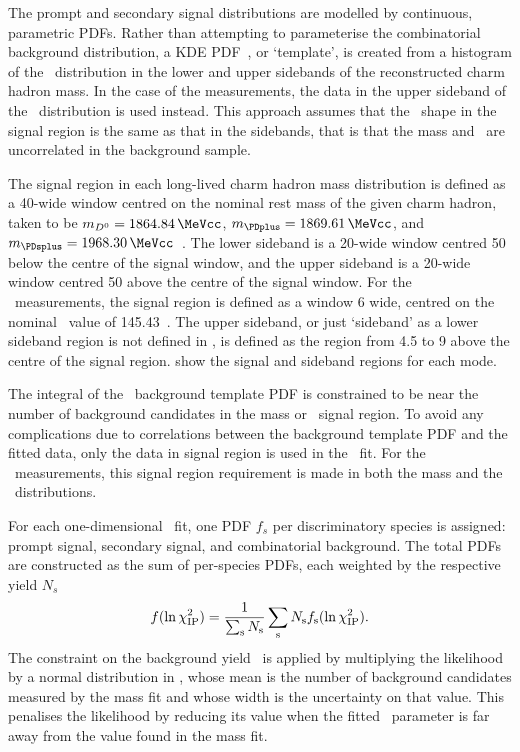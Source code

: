 The prompt and secondary signal distributions are modelled by continuous, 
parametric \acp{PDF}.
Rather than attempting to parameterise the combinatorial background 
distribution, a \acf{KDE} \ac{PDF}~\cite{Poluektov:2014rxa}, or `template', is 
created from a histogram of the \lnipchisq\ distribution in the lower and upper 
sidebands of the reconstructed charm hadron mass.
In the case of the \PDstarp measurements, the data in the upper sideband of the 
\deltam\ distribution is used instead.
This approach assumes that the \lnipchisq\ shape in the signal region is the 
same as that in the sidebands, that is that the mass and \lnipchisq\ are 
uncorrelated in the background sample.

The signal region in each long-lived charm hadron mass distribution is defined 
as a \SI{40}{\MeVcc}-wide window centred on the nominal rest mass of the given 
charm hadron, taken to be ${m_{\PDzero} = \SI{1864.84}{\MeVcc}}$, ${m_{\PDplus} 
  = \SI{1869.61}{\MeVcc}}$, and ${m_{\PDsplus} = 
  \SI{1968.30}{\MeVcc}}$~\cite{PDG2014}.
The lower sideband is a \SI{20}{\MeVcc}-wide window centred \SI{50}{\MeVcc} 
below the centre of the signal window, and the upper sideband is a 
\SI{20}{\MeVcc}-wide window centred \SI{50}{\MeVcc} above the centre of the 
signal window.
For the \PDstarp\ measurements, the signal region is defined as a window 
\SI{6}{\MeVcc} wide, centred on the nominal \deltam\ value of 
\SI{145.43}{\MeVcc}~\cite{PDG2014}.
The upper sideband, or just `sideband' as a lower sideband region is not 
defined in \deltam, is defined as the region from \SI{4.5}{\MeVcc} to 
\SI{9}{\MeVcc} above the centre of the signal region.
show the signal and sideband regions for each mode.

The integral of the \lnipchisq\ background template \ac{PDF} is constrained to 
be near the number of background candidates in the mass or \deltam\ signal 
region.
To avoid any complications due to correlations between the background template 
\ac{PDF} and the fitted data, only the data in signal region is used in the 
\lnipchisq\ fit.
For the \PDstarp\ measurements, this signal region requirement is made in both 
the \PDzero mass and the \deltam\ distributions.

For each one-dimensional \lnipchisq\ fit, one \ac{PDF} $f_{s}$ per 
discriminatory species is assigned: prompt signal, secondary signal, and 
combinatorial background.
The total \acp{PDF} are constructed as the sum of per-species \acp{PDF}, 
each weighted by the respective yield $N_{s}$
\begin{equation}
  f(\ln\chi^2_{\textnormal{IP}}) = \frac{1}{\sum_{\textnormal{s}} N_{\textnormal{s}}}
                  \sum_{\text{s}} N_{\text{s}}
                  f_{\text{s}}(\ln\chi^2_{\textnormal{IP}}).
\end{equation}
The constraint on the background yield \nbkg\ is applied by multiplying the 
likelihood by a normal distribution in \nbkg, whose mean is the number of 
background candidates measured by the mass fit and whose width is the 
uncertainty on that value.
This penalises the likelihood by reducing its value when the fitted \nbkg\ 
parameter is far away from the value found in the mass fit.

